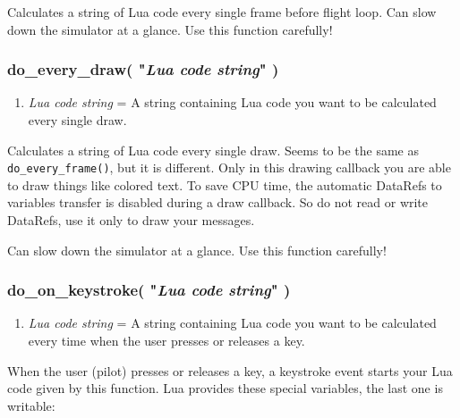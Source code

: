 \documentclass[11pt,parskip=half,a4paper]{scrartcl}
\begin{document}
Calculates a string of Lua code every single frame before flight loop. Can slow down the simulator at a glance. Use this function carefully!


\subsubsection{do\_every\_draw( "\emph{Lua code string}" )}

\begin{enumerate}
	\item \emph{Lua code string} = A string containing Lua code you want to be calculated every single draw.
\end{enumerate}

Calculates a string of Lua code every single draw. Seems to be the same as \verb|do_every_frame()|, but it is different. Only in this drawing callback you are able to draw things like colored text. To save CPU time, the automatic DataRefs to variables transfer is disabled during a draw callback. So do not read or write DataRefs, use it only to draw your messages.

Can slow down the simulator at a glance. Use this function carefully!

\subsubsection{do\_on\_keystroke( "\emph{Lua code string}" )}

\begin{enumerate}
	\item \emph{Lua code string} = A string containing Lua code you want to be calculated every time when the user presses or releases a key.
\end{enumerate}

When the user (pilot) presses or releases a key, a keystroke event starts your Lua code given by this function. Lua provides these special variables, the last one is writable:
\end{document}
